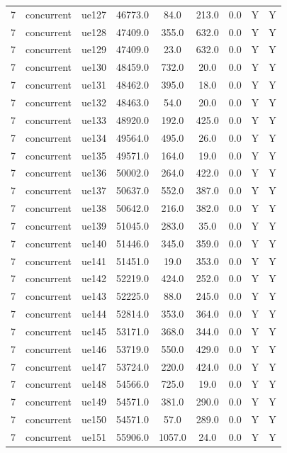 \begin{table}[ht]
\begin{tabular}{|c|c|c|c|c|c|c|c|c|}
7 & concurrent & ue127 & 46773.0 & 84.0 & 213.0 & 0.0 & Y & Y \\
7 & concurrent & ue128 & 47409.0 & 355.0 & 632.0 & 0.0 & Y & Y \\
7 & concurrent & ue129 & 47409.0 & 23.0 & 632.0 & 0.0 & Y & Y \\
7 & concurrent & ue130 & 48459.0 & 732.0 & 20.0 & 0.0 & Y & Y \\
7 & concurrent & ue131 & 48462.0 & 395.0 & 18.0 & 0.0 & Y & Y \\
7 & concurrent & ue132 & 48463.0 & 54.0 & 20.0 & 0.0 & Y & Y \\
7 & concurrent & ue133 & 48920.0 & 192.0 & 425.0 & 0.0 & Y & Y \\
7 & concurrent & ue134 & 49564.0 & 495.0 & 26.0 & 0.0 & Y & Y \\
7 & concurrent & ue135 & 49571.0 & 164.0 & 19.0 & 0.0 & Y & Y \\
7 & concurrent & ue136 & 50002.0 & 264.0 & 422.0 & 0.0 & Y & Y \\
7 & concurrent & ue137 & 50637.0 & 552.0 & 387.0 & 0.0 & Y & Y \\
7 & concurrent & ue138 & 50642.0 & 216.0 & 382.0 & 0.0 & Y & Y \\
7 & concurrent & ue139 & 51045.0 & 283.0 & 35.0 & 0.0 & Y & Y \\
7 & concurrent & ue140 & 51446.0 & 345.0 & 359.0 & 0.0 & Y & Y \\
7 & concurrent & ue141 & 51451.0 & 19.0 & 353.0 & 0.0 & Y & Y \\
7 & concurrent & ue142 & 52219.0 & 424.0 & 252.0 & 0.0 & Y & Y \\
7 & concurrent & ue143 & 52225.0 & 88.0 & 245.0 & 0.0 & Y & Y \\
7 & concurrent & ue144 & 52814.0 & 353.0 & 364.0 & 0.0 & Y & Y \\
7 & concurrent & ue145 & 53171.0 & 368.0 & 344.0 & 0.0 & Y & Y \\
7 & concurrent & ue146 & 53719.0 & 550.0 & 429.0 & 0.0 & Y & Y \\
7 & concurrent & ue147 & 53724.0 & 220.0 & 424.0 & 0.0 & Y & Y \\
7 & concurrent & ue148 & 54566.0 & 725.0 & 19.0 & 0.0 & Y & Y \\
7 & concurrent & ue149 & 54571.0 & 381.0 & 290.0 & 0.0 & Y & Y \\
7 & concurrent & ue150 & 54571.0 & 57.0 & 289.0 & 0.0 & Y & Y \\
7 & concurrent & ue151 & 55906.0 & 1057.0 & 24.0 & 0.0 & Y & Y \\

\end{tabular}
\end{table}
